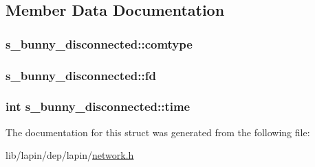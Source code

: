 \subsection{Member Data Documentation}
\hypertarget{structs__bunny__disconnected_a39507b3dfd83feca1af66d874c540673}{
\subsubsection[{comtype}]{ s\-\_\-bunny\-\_\-disconnected\-::comtype}}\label{structs__bunny__disconnected_a39507b3dfd83feca1af66d874c540673}
\hypertarget{structs__bunny__disconnected_a7f9c7aebb44f2646df1d316184f4bd35}{
\subsubsection[{fd}]{ s\-\_\-bunny\-\_\-disconnected\-::fd}}\label{structs__bunny__disconnected_a7f9c7aebb44f2646df1d316184f4bd35}
\hypertarget{structs__bunny__disconnected_a6be551100d11ee0b2da193a700af1d52}{
\subsubsection[{time}]{ {\bf int} s\-\_\-bunny\-\_\-disconnected\-::time}}\label{structs__bunny__disconnected_a6be551100d11ee0b2da193a700af1d52}


The documentation for this struct was generated from the following file\-:\begin{DoxyCompactItemize}
\item 
lib/lapin/dep/lapin/\hyperlink{network_8h}{network.\-h}\end{DoxyCompactItemize}
